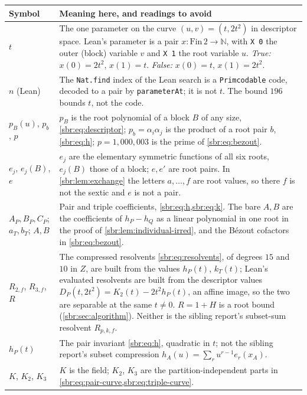\documentclass[11pt,letterpaper]{article}
\numberwithin{equation}{section}
\theoremstyle{definition}
\theoremstyle{remark}
\newcommand{\NN}{\mathbb N}
\newcommand{\src}[1]{\texttt{\nolinkurl{#1}}}
\begin{document}
\begin{center}
\small
\begin{longtable}{@{}>{\raggedright\arraybackslash}p{}
 >{\raggedright\arraybackslash}p{}@{}}
\toprule
Symbol & Meaning here, and readings to avoid\\
\midrule
\endhead
\bottomrule
\endfoot
$t$ & The one parameter on the curve $(u,v)=(t,2t^2)$ in descriptor space.
Lean's parameter is a pair $x\colon\mathrm{Fin}\,2\to\NN$, with \src{X 0} the outer
(block) variable $v$ and \src{X 1} the root variable $u$. \emph{True:}
$x(0)=2t^2$, $x(1)=t$. \emph{False:} $x(0)=t$, $x(1)=2t^2$.\\[3pt]
$n$ (Lean) & The \src{Nat.find} index of the Lean search is a
\src{Primcodable} code, decoded to a pair by \src{parameterAt}; it is not
$t$. The bound $196$ bounds $t$, not the code.\\[3pt]
$p_B(u)$, $p_b$, $p$ & $p_B$ is the root polynomial of a block $B$ of any
size, \cref{sbr:eq:descriptor}; $p_b=\alpha_i\alpha_j$ is the product of a
root pair $b$, \cref{sbr:eq:h}; $p=1{,}000{,}003$ is the prime of
\cref{sbr:eq:bezout}.\\[3pt]
$e_j$, $e_j(B)$, $e$ & $e_j$ are the elementary symmetric functions of all
six roots, $e_j(B)$ those of a block; $e,e'$ are root pairs. In
\cref{sbr:lem:exchange} the letters $a,\ldots,f$ are root values, so there
$f$ is not the sextic and $e$ is not a pair.\\[3pt]
$A_P,B_P,C_P$; $a_T,b_T$; $A,B$ & Pair and triple coefficients,
\cref{sbr:eq:h,sbr:eq:k}. The bare $A,B$ are the coefficients of
$h_P-h_Q$ as a linear polynomial in one root in the proof of
\cref{sbr:lem:individual-irred}, and the B\'ezout cofactors in
\cref{sbr:eq:bezout}.\\[3pt]
$R_{2,f}$, $R_{3,f}$, $R$ & The compressed resolvents
\cref{sbr:eq:resolvents}, of degrees $15$ and $10$ in $Z$, are built from
the values $h_P(t)$, $k_T(t)$; Lean's evaluated resolvents are built from
the descriptor values $D_P(t,2t^2)=K_2(t)-2t^2h_P(t)$, an affine image, so
the two are separable at the same $t\ne0$. $R=1+H$ is a root bound
(\cref{sbr:sec:algorithm}). Neither is the sibling report's subset-sum
resolvent $R_{p,k,f}$.\\[3pt]
$h_P(t)$ & The pair invariant \cref{sbr:eq:h}, quadratic in $t$; not the
sibling report's subset compression $h_A(u)=\sum_r u^{r-1}e_r(x_A)$.\\[3pt]
$K$, $K_2$, $K_3$ & $K$ is the field; $K_2$, $K_3$ are the
partition-independent parts in \cref{sbr:eq:pair-curve,sbr:eq:triple-curve}.\\[3pt]

\end{longtable}
\end{center}
\end{document}
